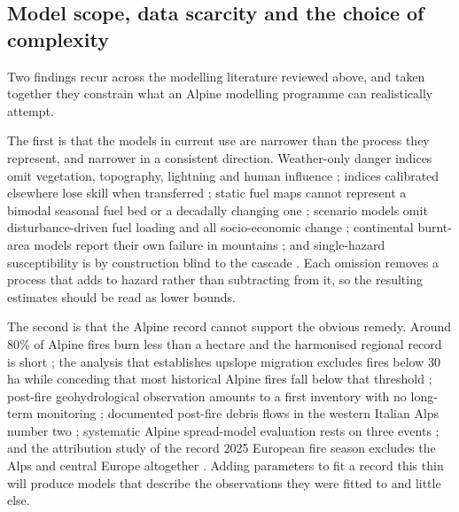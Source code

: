 \documentclass[11pt,a4paper]{article}
\begin{document}
\subsection{Model scope, data scarcity and the choice of complexity}
\label{sec:complexity}

Two findings recur across the modelling literature reviewed above, and taken together they constrain what an Alpine modelling programme can realistically attempt.

The first is that the models in current use are narrower than the process they represent, and narrower in a consistent direction. Weather-only danger indices omit vegetation, topography, lightning and human influence \citep{muller_towards_2020}; indices calibrated elsewhere lose skill when transferred \citep{de_angelis_modelling_2015, gelabert_assessing_2025}; static fuel maps cannot represent a bimodal seasonal fuel bed or a decadally changing one \citep{bebi_changes_2017, frei_evidence_2023}; scenario models omit disturbance-driven fuel loading and all socio-economic change \citep{gerberding_mapping_2025}; continental burnt-area models report their own failure in mountains \citep{forrest_understanding_2024}; and single-hazard susceptibility is by construction blind to the cascade \citep{trucchia_defining_2022}. Each omission removes a process that adds to hazard rather than subtracting from it, so the resulting estimates should be read as lower bounds.

The second is that the Alpine record cannot support the obvious remedy. Around 80\% of Alpine fires burn less than a hectare and the harmonised regional record is short \citep{muller_forest_2020}; the analysis that establishes upslope migration excludes fires below 30\,ha while conceding that most historical Alpine fires fall below that threshold \citep{beloiu_climatedriven_2026}; post-fire geohydrological observation amounts to a first inventory with no long-term monitoring \citep{melzner_wildfire-induced_2025}; documented post-fire debris flows in the western Italian Alps number two \citep{tiranti_wildfires_2021}; systematic Alpine spread-model evaluation rests on three events \citep{malanchini_modeling_2025}; and the attribution study of the record 2025 European fire season excludes the Alps and central Europe altogether \citep{keeping_attribution_2026}. Adding parameters to fit a record this thin will produce models that describe the observations they were fitted to and little else.
\end{document}
